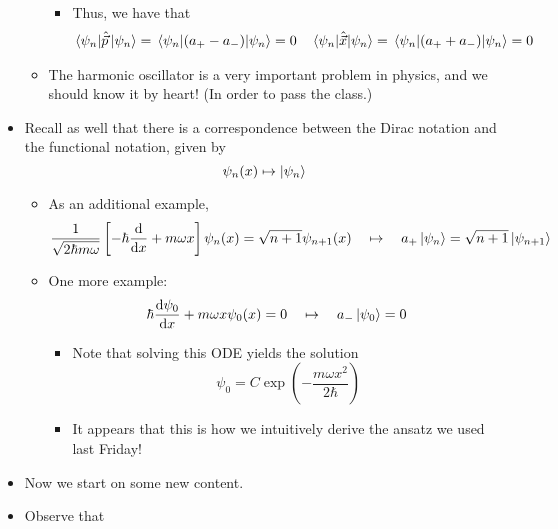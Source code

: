 \documentclass[../notes.tex]{subfiles}
\begin{document}
\begin{itemize}
\begin{itemize}
        \begin{itemize}
            \item Thus, we have that
            \begin{align*}
                \ev{\hat{\vec{p}}\,}{\psi_n} &= \ev{(a_+-a_-)}{\psi_n} = 0&
                \ev{\hat{\vec{x}}}{\psi_n} &= \ev{(a_++a_-)}{\psi_n} = 0
            \end{align*}
        \end{itemize}
        \item The harmonic oscillator is a very important problem in physics, and we should know it by heart! (In order to pass the class.)
    \end{itemize}
    \item Recall as well that there is a correspondence between the Dirac notation and the functional notation, given by
    \begin{equation*}
        \psi_n(x) \mapsto \ket{\psi_n}
    \end{equation*}
    \begin{itemize}
        \item As an additional example,
        \begin{equation*}
            \frac{1}{\sqrt{2\hbar m\omega}}\left[ -\hbar\dv{x}+m\omega x \right]\psi_n(x) = \sqrt{n+1}\psi_{n+1}(x)
            \quad\mapsto\quad
            a_+\ket{\psi_n} = \sqrt{n+1}\ket{\psi_{n+1}}
        \end{equation*}
        \item One more example:
        \begin{equation*}
            \hbar\dv{\psi_0}{x}+m\omega x\psi_0(x) = 0
            \quad\mapsto\quad
            a_-\ket{\psi_0} = 0
        \end{equation*}
        \begin{itemize}
            \item Note that solving this ODE yields the solution
            \begin{equation*}
                \psi_0 = C\exp(-\frac{m\omega x^2}{2\hbar})
            \end{equation*}
            \item It appears that this is how we intuitively derive the ansatz we used last Friday!
        \end{itemize}
    \end{itemize}
    \item Now we start on some new content.
    \item Observe that

\end{itemize}
\end{document}
